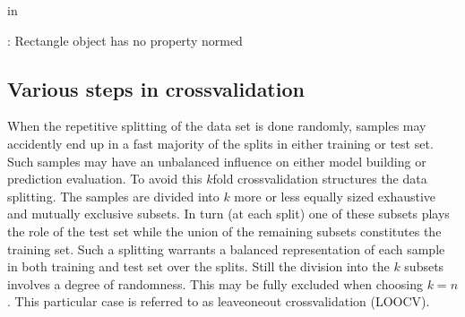 \documentclass[letterpaper,10pt,english]{sphinxmanual}
\begin{document}
\begin{sphinxVerbatim}[commandchars=\\\{\}]
 in 
                       
                   
                      
                                           
                  

: \PYGZsq{}Rectangle\PYGZsq{} object has no property \PYGZsq{}normed\PYGZsq{}
\end{sphinxVerbatim}

\noindent{}




\subsection{Various steps in cross\sphinxhyphen{}validation}
\label{\detokenize{chapter4:various-steps-in-cross-validation}}
When the repetitive splitting of the data set is done randomly,
samples may accidently end up in a fast majority of the splits in
either training or test set. Such samples may have an unbalanced
influence on either model building or prediction evaluation. To avoid
this \(k\)\sphinxhyphen{}fold cross\sphinxhyphen{}validation structures the data splitting. The
samples are divided into \(k\) more or less equally sized exhaustive and
mutually exclusive subsets. In turn (at each split) one of these
subsets plays the role of the test set while the union of the
remaining subsets constitutes the training set. Such a splitting
warrants a balanced representation of each sample in both training and
test set over the splits. Still the division into the \(k\) subsets
involves a degree of randomness. This may be fully excluded when
choosing \(k=n\). This particular case is referred to as leave\sphinxhyphen{}one\sphinxhyphen{}out
cross\sphinxhyphen{}validation (LOOCV).
\end{document}
